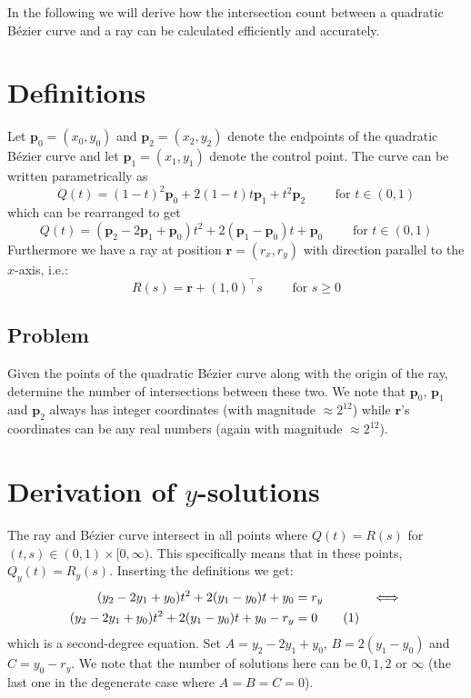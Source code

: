 \documentclass[11pt, a4paper]{article}
\newcommand{\numberhere}{\stepcounter{equation}\tag{\theequation}}
\renewcommand\vec[1]{\boldsymbol{#1}}
\begin{document}
In the following we will derive how the intersection count between a quadratic Bézier curve and a ray can be calculated efficiently and accurately.
\section{Definitions}
Let $\vec p_0 = (x_0, y_0)$ and $\vec p_2 = (x_2, y_2)$ denote the endpoints of the quadratic Bézier curve and let $\vec p_1 = (x_1, y_1)$ denote the control point. The curve can be written parametrically as
\begin{equation*}
Q(t) = (1-t)^2 \vec p_0 + 2(1-t)t \vec p_1 + t^2 \vec p_2 \qquad \text{ for } t \in (0, 1)
\end{equation*}
which can be rearranged to get
\begin{equation}
\label{eq:bezierdef}
Q(t) = (\vec p_2 - 2\vec p_1 + \vec p_0)t^2 + 2(\vec p_1 - \vec p_0)t + \vec p_0 \qquad \text{ for } t \in (0, 1)
\end{equation}
Furthermore we have a ray at position $\vec r = (r_x, r_y)$ with direction parallel to the $x$-axis, i.e.:
\begin{equation}
\label{eq:raydef}
R(s) = \vec r + (1, 0)^\top s \qquad \text{ for } s \geq 0
\end{equation}

\subsection{Problem}
Given the points of the quadratic Bézier curve along with the origin of the ray, determine the number of intersections between these two. We note that $\vec p_0$, $\vec p_1$ and $\vec p_2$ always has integer coordinates (with magnitude $\approx 2^{12}$) while $\vec r$'s coordinates can be any real numbers (again with magnitude $\approx 2^{12}$).

\section{Derivation of $y$-solutions}
The ray and Bézier curve intersect in all points where $Q(t) = R(s)$ for $(t, s)\in(0,1)\times[0,\infty)$.
This specifically means that in these points, $Q_y(t) = R_y(s)$. Inserting the definitions we get:
\begin{align*}
(y_2 - 2y_1 + y_0)t^2 + 2(y_1 - y_0)t + y_0 &= r_y &\iff\\
(y_2 - 2y_1 + y_0)t^2 + 2(y_1 - y_0)t + y_0 - r_y &= 0 \numberhere\label{eq:sdeq}
\end{align*}
which is a second-degree equation. Set $A=y_2-2y_1+y_0$, $B=2(y_1-y_0)$ and $C=y_0-r_y$.
We note that the number of solutions here can be $0, 1, 2$ or $\infty$ (the last one in the degenerate case where $A=B=C=0$).
\end{document}
